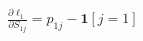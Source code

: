 \documentclass[border=6pt]{standalone}
\begin{document}
\color{ink}\begin{minipage}{165pt}\centering$\displaystyle \frac{\partial\ell_1}{\partial S_{1j}}=p_{1j}-\mathbf 1[j=1]$\end{minipage}
\end{document}
